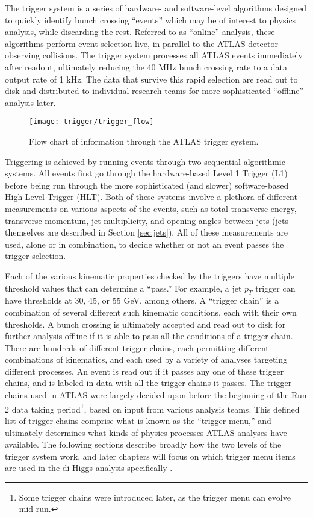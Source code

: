     The trigger system is a series of hardware- and software-level algorithms designed
        to quickly identify bunch crossing ``events'' which may be of interest to physics analysis,
        while discarding the rest.
    Referred to as ``online'' analysis, these algorithms perform event selection live,
        in parallel to the ATLAS detector observing collisions.
    The trigger system processes all ATLAS events immediately after readout,
        ultimately reducing the 40 MHz bunch crossing rate to a data output rate of 1 kHz.
    The data that survive this rapid selection are read out to disk
        and distributed to individual research teams for more sophisticated ``offline'' analysis later.

    \begin{figure}[h]
        \texttt{[image: trigger/trigger\_flow]}
        \caption{Flow chart of information through the ATLAS trigger system\cite{trigger_run2}.}
        \label{fig:trigger_flow}
    \end{figure}
    
    Triggering is achieved by running events through two sequential algorithmic systems.
    All events first go through the hardware-based Level 1 Trigger (L1) before being run through the more sophisticated (and slower) software-based High Level Trigger (HLT).
    Both of these systems involve a plethora of different measurements on various aspects of the events,
        such as total transverse energy, transverse momentum, jet multiplicity, and opening angles between jets
        (jets themselves are described in Section \ref{sec:jets}).
    All of these measurements are used, alone or in combination, to decide whether or not an event passes the trigger selection.

    Each of the various kinematic properties checked by the triggers have multiple threshold values that can determine a ``pass.''
    For example, a jet $p_T$ trigger can have thresholds at 30, 45, or 55 GeV, among others.
    A ``trigger chain'' is a combination of several different such kinematic conditions, each with their own thresholds.
    A bunch crossing is ultimately accepted and read out to disk for further analysis offline if it is able to pass all the conditions of a trigger chain.
    There are hundreds of different trigger chains, each permitting different combinations of kinematics,
        and each used by a variety of analyses targeting different processes.
    An event is read out if it passes any one of these trigger chains, and is labeled in data with all the trigger chains it passes.
    The trigger chains used in ATLAS were largely decided upon before the beginning of the Run 2 data taking period\footnote{
            Some trigger chains were introduced later, as the trigger menu can evolve mid-run.
        }, based on input from various analysis teams.
    This defined list of trigger chains comprise what is known as the ``trigger menu,'' and ultimately determines what kinds of physics processes ATLAS analyses have available.
    The following sections describe broadly how the two levels of the trigger system work, and later chapters will focus on which trigger menu items are used in the di-Higgs analysis specifically .

